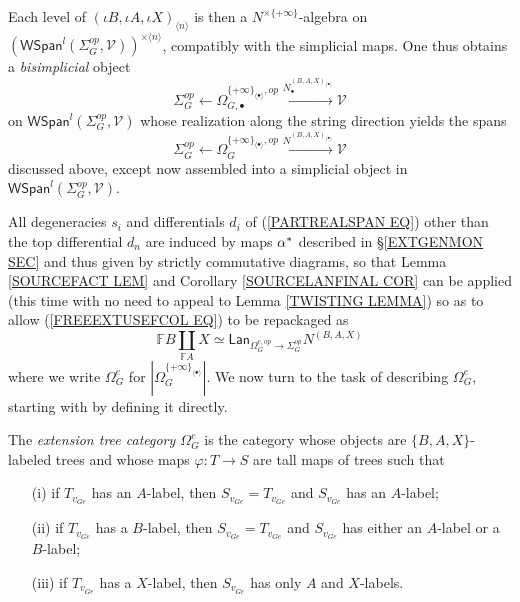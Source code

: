 \documentclass[a4paper,10pt]{article}%
\begin{document}
Each level of $(\iota B,\iota A,\iota X)_{\langle n \rangle}$ is then a $N^{\times \{+\infty\}}$-algebra on 
$\left(
\mathsf{WSpan}^l(\Sigma_G^{op},\mathcal{V})
\right)^{\times \langle n \rangle}$, compatibly with the simplicial maps. One thus obtains a \textit{bisimplicial} object 
\[
	\Sigma_G^{op} \leftarrow 
	\Omega_{G,\bullet}^{\{+\infty\}_{\langle \bullet \rangle},op}
	\xrightarrow{N_{\bullet}^{(B,A,X)_{\langle \bullet \rangle}}}
	\mathcal{V}
\]
on $\mathsf{WSpan}^l(\Sigma_G^{op},\mathcal{V})$
whose realization along the string direction yields the
spans 
\begin{equation}\label{PARTREALSPAN EQ}
	\Sigma_G^{op} \leftarrow 
	\Omega_{G}^{\{+\infty\}_{\langle \bullet \rangle},op}
	\xrightarrow{N^{(B,A,X)_{\langle \bullet \rangle}}}
	\mathcal{V}
\end{equation}
discussed above, except now assembled into a simplicial object in $\mathsf{WSpan}^l(\Sigma_G^{op},\mathcal{V})$.



All degeneracies $s_i$ and differentials $d_i$ of 
(\ref{PARTREALSPAN EQ}) other than the top differential $d_n$ are induced by maps $\alpha^{\**}$ described in \S \ref{EXTGENMON SEC} and thus given by strictly commutative diagrams, so that Lemma \ref{SOURCEFACT LEM} and Corollary \ref{SOURCELANFINAL COR} can be applied (this time with no need to appeal to Lemma \ref{TWISTING LEMMA}) so as to allow 
(\ref{FREEEXTUSEFCOL EQ}) to be repackaged as 
\begin{equation}\label{FREEEXTUSEFCOL EQ}
	\mathbb{F} B \coprod_{\mathbb{F} A} X
\simeq
	\mathsf{Lan}_{\Omega_G^{e,op} \to \Sigma_G^{op}} 
	N^{(B,A,X)}
\end{equation}
where we write $\Omega_G^e$ for 
$|\Omega_{G}^{\{+\infty\}_{\langle \bullet \rangle}}|$.
We now turn to the task of describing $\Omega_G^e$, starting with by defining it directly.

\begin{definition}
	The \textit{extension tree category $\Omega_G^e$} is the category whose objects are $\{B,A,X\}$-labeled trees and whose maps $\varphi \colon T \to S$ are tall maps of trees such that
	\begin{itemize}
		\item[(i)] if $T_{v_{Ge}}$ has an $A$-label, then 
		$S_{v_{Ge}}=T_{v_{Ge}}$ and $S_{v_{Ge}}$ has an $A$-label;
		\item[(ii)] if $T_{v_{Ge}}$ has a $B$-label, then 
		$S_{v_{Ge}}=T_{v_{Ge}}$ and $S_{v_{Ge}}$ has either an $A$-label or a $B$-label;
		\item[(iii)] if $T_{v_{Ge}}$ has a $X$-label, then 
		$S_{v_{Ge}}$ has only $A$ and $X$-labels.
	\end{itemize}
\end{definition}
\end{document}
